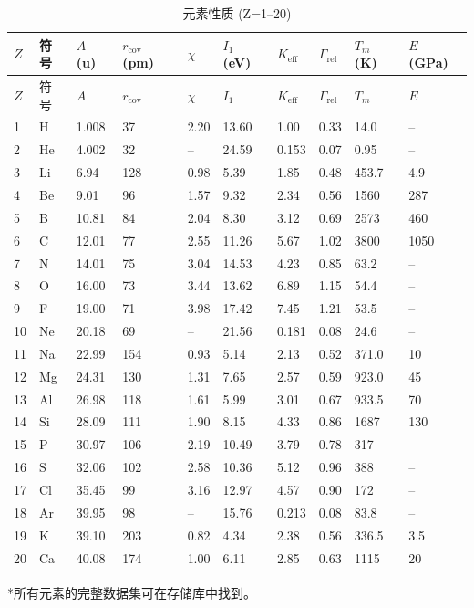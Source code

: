 \documentclass[12pt,a4paper]{article}
\newcommand{\Keff}{K_{\mathrm{eff}}}
\begin{document}
	\begin{longtable}{p{0.6cm}p{1.2cm}p{1.2cm}p{1.2cm}p{1.2cm}p{1.2cm}p{1.5cm}p{1.2cm}p{1.2cm}p{1.2cm}}
		\caption{元素性质 (Z=1–20)} \label{tab:elem-data-first20} \\
		\toprule
		\(Z\) & 符号 & \(A\) (u) & \(r_{\text{cov}}\) (pm) & \(\chi\) & \(I_1\) (eV) & \(\Keff\) & \(\Gamma_{\text{rel}}\) & \(T_m\) (K) & \(E\) (GPa) \\
		\midrule
		\endfirsthead
		\toprule
		\(Z\) & 符号 & \(A\) & \(r_{\text{cov}}\) & \(\chi\) & \(I_1\) & \(\Keff\) & \(\Gamma_{\text{rel}}\) & \(T_m\) & \(E\) \\
		\midrule
		\endhead
		1  & H  & 1.008  & 37   & 2.20 & 13.60 & 1.00  & 0.33  & 14.0  & – \\
		2  & He & 4.002  & 32   & –    & 24.59 & 0.153 & 0.07  & 0.95  & – \\
		3  & Li & 6.94   & 128  & 0.98 & 5.39  & 1.85  & 0.48  & 453.7 & 4.9 \\
		4  & Be & 9.01   & 96   & 1.57 & 9.32  & 2.34  & 0.56  & 1560  & 287 \\
		5  & B  & 10.81  & 84   & 2.04 & 8.30  & 3.12  & 0.69  & 2573  & 460\footnotemark \\
		6  & C  & 12.01  & 77   & 2.55 & 11.26 & 5.67  & 1.02  & 3800  & 1050\footnotemark \\
		7  & N  & 14.01  & 75   & 3.04 & 14.53 & 4.23  & 0.85  & 63.2  & – \\
		8  & O  & 16.00  & 73   & 3.44 & 13.62 & 6.89  & 1.15  & 54.4  & – \\
		9  & F  & 19.00  & 71   & 3.98 & 17.42 & 7.45  & 1.21  & 53.5  & – \\
		10 & Ne & 20.18  & 69   & –    & 21.56 & 0.181 & 0.08  & 24.6  & – \\
		11 & Na & 22.99  & 154  & 0.93 & 5.14  & 2.13  & 0.52  & 371.0 & 10 \\
		12 & Mg & 24.31  & 130  & 1.31 & 7.65  & 2.57  & 0.59  & 923.0 & 45 \\
		13 & Al & 26.98  & 118  & 1.61 & 5.99  & 3.01  & 0.67  & 933.5 & 70 \\
		14 & Si & 28.09  & 111  & 1.90 & 8.15  & 4.33  & 0.86  & 1687  & 130 \\
		15 & P  & 30.97  & 106  & 2.19 & 10.49 & 3.79  & 0.78  & 317   & – \\
		16 & S  & 32.06  & 102  & 2.58 & 10.36 & 5.12  & 0.96  & 388   & – \\
		17 & Cl & 35.45  & 99   & 3.16 & 12.97 & 4.57  & 0.90  & 172   & – \\
		18 & Ar & 39.95  & 98   & –    & 15.76 & 0.213 & 0.08  & 83.8  & – \\
		19 & K  & 39.10  & 203  & 0.82 & 4.34  & 2.38  & 0.56  & 336.5 & 3.5 \\
		20 & Ca & 40.08  & 174  & 1.00 & 6.11  & 2.85  & 0.63  & 1115  & 20 \\
		\bottomrule
	\end{longtable}
	\vspace{0.2cm}
	*所有元素的完整数据集可在存储库中找到。
	
\end{document}
